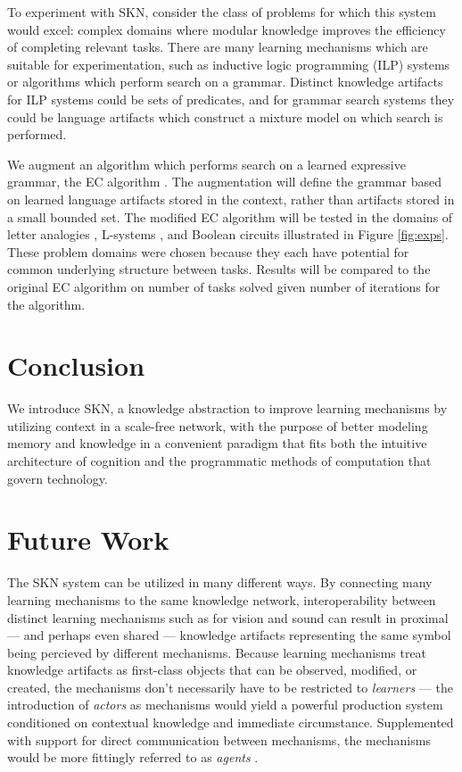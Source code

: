 \documentclass[11pt,letterpaper]{article}
\begin{document}
To experiment with SKN, consider the class of problems for which this system
would excel: complex domains where modular knowledge improves the efficiency
of completing relevant tasks. There are many learning mechanisms which are
suitable for experimentation, such as inductive logic programming (ILP)
systems or algorithms which perform search on a grammar. Distinct knowledge
artifacts for ILP systems could be sets of predicates, and for grammar
search systems they could be language artifacts which construct a mixture
model on which search is performed.

We augment an algorithm which performs search on a learned expressive
grammar, the EC algorithm \cite{dechter13}. The augmentation will define the
grammar based on learned language artifacts stored in the context, rather
than artifacts stored in a small bounded set. The modified EC algorithm will
be tested in the domains of letter analogies \cite{hofstadter94}, L-systems
\cite{rozenberg80}, and Boolean circuits illustrated in Figure
\ref{fig:exps}. These problem domains were chosen because they each have
potential for common underlying structure between tasks. Results will be
compared to the original EC algorithm on number of tasks solved given number
of iterations for the algorithm.


\section{Conclusion}

We introduce SKN, a knowledge abstraction to improve learning mechanisms by
utilizing context in a scale-free network, with the purpose of better
modeling memory and knowledge in a convenient paradigm that fits both the
intuitive architecture of cognition and the programmatic methods of
computation that govern technology.


\section{Future Work}

The SKN system can be utilized in many different ways. By connecting many
learning mechanisms to the same knowledge network, interoperability between
distinct learning mechanisms such as for vision and sound can result in
proximal --- and perhaps even shared --- knowledge artifacts representing
the same symbol being percieved by different mechanisms. Because learning
mechanisms treat knowledge artifacts as first-class objects that can be
observed, modified, or created, the mechanisms don't necessarily have to be
restricted to \emph{learners} --- the introduction of \emph{actors} as
mechanisms would yield a powerful production system conditioned on
contextual knowledge and immediate circumstance. Supplemented with support
for direct communication between mechanisms, the mechanisms would be more
fittingly referred to as
\emph{agents} \cite{minsky88}.
\end{document}
